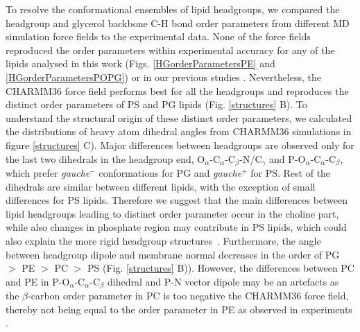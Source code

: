 \documentclass[aps,prl,superscriptaddress,twocolumn]{revtex4}
\begin{document}
To resolve the conformational ensembles of lipid headgroups,
we compared the headgroup and glycerol backbone C-H bond order parameters
from different MD simulation force fields to the experimental data. 
None of the force fields reproduced the order parameters
within experimental accuracy for any of the lipids analysed in this work
(Figs. \ref{HGorderParametersPE} and \ref{HGorderParametersPOPG}) or in our previous studies \cite{botan15,antila19}.
Nevertheless, the CHARMM36 force field performs best for all the headgroups and
reproduces the distinct order parameters of PS and PG lipids (Fig. \ref{structures} B).
To understand the structural origin of these distinct order parameters,
we calculated the distributions of heavy atom dihedral angles from CHARMM36 simulations in figure \ref{structures} C).
Major differences between headgroups are observed only for the last two dihedrals
in the headgroup end,  O$_\alpha$-C$_\alpha$-C$_\beta$-N/C$_\gamma$ and P-O$_\alpha$-C$_\alpha$-C$_\beta$,
which prefer {\it gauche$^-$} conformations for PG and {\it gauche$^+$} for PS.
Rest of the dihedrals are similar between different lipids, with the exception of
small differences for PS lipids. Therefore we suggest that the main differences between
lipid headgroups leading to distinct order parameter occur in the choline part, while
also changes in phosphate region may contribute in PS lipids, which could also
explain the more rigid headgroup structures~\cite{browning80,buldt81}.
Furthermore, the angle between headgroup dipole and membrane normal
decreases in the order of PG $>$ PE  $>$ PC  $>$ PS (Fig. \ref{structures} B)).
However, the differences between PC and PE in P-O$_\alpha$-C$_\alpha$-C$_\beta$ dihedral
and P-N vector dipole may be an artefacts as the $\beta$-carbon order parameter in PC
is too negative the CHARMM36 force field, thereby not being equal to the order parameter
in PE as observed in experiments \cite{botan15}.
\end{document}
